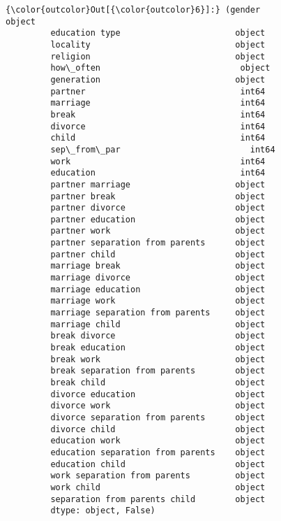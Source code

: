 \documentclass[11pt]{article}
\begin{document}
\begin{Verbatim}[commandchars=\\\{\}]
{\color{outcolor}Out[{\color{outcolor}6}]:} (gender                               object
         education type                       object
         locality                             object
         religion                             object
         how\_often                            object
         generation                           object
         partner                               int64
         marriage                              int64
         break                                 int64
         divorce                               int64
         child                                 int64
         sep\_from\_par                          int64
         work                                  int64
         education                             int64
         partner marriage                     object
         partner break                        object
         partner divorce                      object
         partner education                    object
         partner work                         object
         partner separation from parents      object
         partner child                        object
         marriage break                       object
         marriage divorce                     object
         marriage education                   object
         marriage work                        object
         marriage separation from parents     object
         marriage child                       object
         break divorce                        object
         break education                      object
         break work                           object
         break separation from parents        object
         break child                          object
         divorce education                    object
         divorce work                         object
         divorce separation from parents      object
         divorce child                        object
         education work                       object
         education separation from parents    object
         education child                      object
         work separation from parents         object
         work child                           object
         separation from parents child        object
         dtype: object, False)
\end{Verbatim}
            
\end{document}
